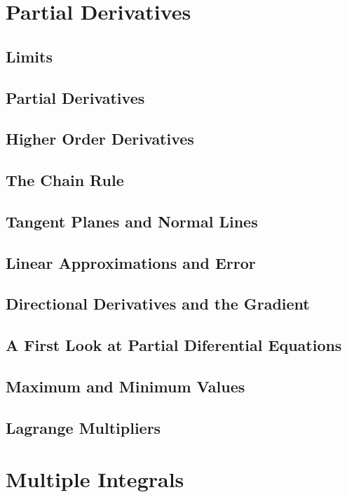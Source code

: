 \documentclass[12pt,a4paper, openany]{book}
\begin{document}
\chapter{Partial Derivatives}
\section{Limits}

\section{Partial Derivatives}

\section{Higher Order Derivatives}

\section{The Chain Rule}

\section{Tangent Planes and Normal Lines}

\section{Linear Approximations and Error}

\section{Directional Derivatives and the Gradient}

\section{A First Look at Partial Diferential Equations}

\section{Maximum and Minimum Values}

\section{Lagrange Multipliers}


\chapter{Multiple Integrals}
\end{document}
